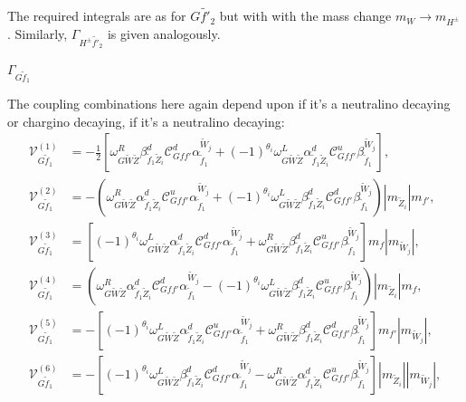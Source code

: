\documentclass[final,3p,times]{elsarticle}
\begin{document}
The required integrals are as for $G \tilde{f'}_2$ but with with the mass change $m_W \rightarrow m_{H^{\pm}}$. Similarly, $\Gamma_{H^{\pm} \tilde{f'}_2}$ is given analogously.

\textbf{\underline{$\Gamma_{G \tilde{f}_1}$}}

The coupling combinations here again depend upon if it's a neutralino decaying or chargino decaying, if it's a neutralino decaying:
\begin{align}
\mathcal{V}_{G \tilde{f}_1}^{(1)} &= -\frac{1}{2}[\omega_{G \tilde{W} \tilde{Z}}^R \beta_{\tilde{f}_1 \tilde{Z}_i}^{d} \mathcal{C}_{G f f'}^d \alpha_{\tilde{f}_1}^{\tilde{W}_j} + (-1)^{\theta_i} \omega_{G \tilde{W} \tilde{Z}}^L \alpha_{\tilde{f}_1 \tilde{Z}_i}^{d} \mathcal{C}_{G f f'}^u \beta_{\tilde{f}_1}^{\tilde{W}_j}], \\
\mathcal{V}_{G \tilde{f}_1}^{(2)} &= -(\omega_{G \tilde{W} \tilde{Z}}^R \alpha_{\tilde{f}_1 \tilde{Z}_i}^{d} \mathcal{C}_{G f f'}^u \alpha_{\tilde{f}_1}^{\tilde{W}_j} + (-1)^{\theta_i} \omega_{G \tilde{W} \tilde{Z}}^L \beta_{\tilde{f}_1 \tilde{Z}_i}^{d} \mathcal{C}_{G f f'}^d \beta_{\tilde{f}_1}^{\tilde{W}_j})|m_{\tilde{Z}_i}|m_{f'}, \\
\mathcal{V}_{G \tilde{f}_1}^{(3)} &= [(-1)^{\theta_i} \omega_{G \tilde{W} \tilde{Z}}^L \alpha_{\tilde{f}_1 \tilde{Z}_i}^{d}  \mathcal{C}_{G f f'}^d \alpha_{\tilde{f}_1}^{\tilde{W}_j} + \omega_{G \tilde{W} \tilde{Z}}^R \beta_{\tilde{f}_1 \tilde{Z}_i}^{d} \mathcal{C}_{G f f'}^u \beta_{\tilde{f}_1}^{\tilde{W}_j}]m_{f}|m_{\tilde{W}_j}|, \\
\mathcal{V}_{G \tilde{f}_1}^{(4)} &= (\omega_{G \tilde{W} \tilde{Z}}^R \alpha_{\tilde{f}_1 \tilde{Z}_i}^{d} \mathcal{C}_{G f f'}^d \alpha_{\tilde{f}_1}^{\tilde{W}_j} - (-1)^{\theta_i}\omega_{G \tilde{W} \tilde{Z}}^L \beta_{\tilde{f}_1 \tilde{Z}_i}^{d} \mathcal{C}_{G f f'}^u \beta_{\tilde{f}_1}^{\tilde{W}_j})|m_{\tilde{Z}_i}|m_{f}, \\
\mathcal{V}_{G \tilde{f}_1}^{(5)} &= -[(-1)^{\theta_i}\omega_{G \tilde{W} \tilde{Z}}^L \alpha_{\tilde{f}_1 \tilde{Z}_i}^{d} \mathcal{C}_{G f f'}^u \alpha_{\tilde{f}_1}^{\tilde{W}_j} + \omega_{G \tilde{W} \tilde{Z}}^R \beta_{\tilde{f}_1 \tilde{Z}_i}^{d} \mathcal{C}_{G f f'}^d \beta_{\tilde{f}_1}^{\tilde{W}_j}]m_{f'}|m_{\tilde{W}_j}|, \\
\mathcal{V}_{G \tilde{f}_1}^{(6)} &= -[(-1)^{\theta_i} \omega_{G \tilde{W} \tilde{Z}}^L \beta_{\tilde{f}_1 \tilde{Z}_i}^{d} \mathcal{C}_{G f f'}^d \alpha_{\tilde{f}_1}^{\tilde{W}_j} - \omega_{G \tilde{W} \tilde{Z}}^R \alpha_{\tilde{f}_1 \tilde{Z}_i}^{d } \mathcal{C}_{G f f'}^u \beta_{\tilde{f}_1}^{\tilde{W}_j}]|m_{\tilde{Z}_i}||m_{\tilde{W}_j}|, \\

\end{align}
\end{document}
